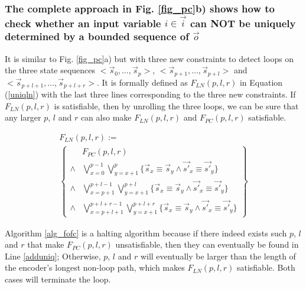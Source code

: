 \documentclass[conference]{IEEEtran}
\begin{document}
\subsubsection{The complete approach in Fig. \ref{fig_pc}b) shows how to check whether
an input variable $i\in\vec{i}$ can NOT be uniquely determined by a bounded sequence of $\vec{o}$}\label{subsub_complete}

It is similar to Fig. \ref{fig_pc}a) but with three new constraints to detect loops 
on the three state sequences $<\vec{s}_{0},\dots,\vec{s}_{p}>$, $<\vec{s}_{p+1},\dots,\vec{s}_{p+l}>$ and 
$<\vec{s}_{p+l+1},\dots,\vec{s}_{p+l+r}>$.
It is formally defined as $F_{LN}(p,l,r)$ in Equation (\ref{uniqln}) 
with the last three lines corresponding to the three new constraints.
If $F_{LN}(p,l,r)$ is satisfiable,
then by unrolling the three loops,
we can be sure that any larger  $p$, $l$ and $r$ can also make $F_{LN}(p,l,r)$ and $F_{PC}(p,l,r)$ satisfiable.

\begin{multline}\label{uniqln}
F_{LN}(p,l,r):=\\
\left\{
\begin{array}{cc}
&F_{PC}(p,l,r)\\
\wedge&\bigvee_{x=0}^{p-1}\bigvee_{y=x+1}^{p} \{\vec{s}_x\equiv \vec{s}_y\wedge \vec{s'}_x\equiv \vec{s'}_y\} \\
\wedge&\bigvee_{x=p+1}^{p+l-1}\bigvee_{y=x+1}^{p+l} \{\vec{s}_x\equiv \vec{s}_y\wedge \vec{s'}_x\equiv \vec{s'}_y\} \\
\wedge&\bigvee_{x=p+l+1}^{p+l+r-1}\bigvee_{y=x+1}^{p+l+r} \{\vec{s}_x\equiv \vec{s}_y\wedge \vec{s'}_x\equiv \vec{s'}_y\}
\end{array}
\right\}
\end{multline}

Algorithm \ref{alg_fofc} is a halting algorithm because 
if there indeed exists such $p$, $l$ and $r$ that make $F_{PC}(p,l,r)$ unsatisfiable,
then they can eventually be found in Line \ref{adduniq};
Otherwise,
$p$, $l$ and $r$ will eventually be larger than the length of the encoder's longest non-loop path,
which makes $F_{LN}(p,l,r)$ satisfiable.
Both cases will terminate the loop.
\end{document}
